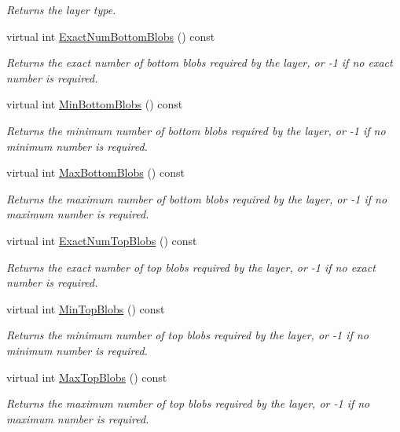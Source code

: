 \begin{DoxyCompactItemize}
\begin{DoxyCompactList}\small\item\em Returns the layer type. \end{DoxyCompactList}\item 
virtual int \hyperlink{classcaffe_1_1Layer_a45c7a7943a8a6735ac433c9be11e0240}{Exact\+Num\+Bottom\+Blobs} () const 
\begin{DoxyCompactList}\small\item\em Returns the exact number of bottom blobs required by the layer, or -\/1 if no exact number is required. \end{DoxyCompactList}\item 
virtual int \hyperlink{classcaffe_1_1Layer_ade3eee97cc743c4e68fff7eba6484916}{Min\+Bottom\+Blobs} () const 
\begin{DoxyCompactList}\small\item\em Returns the minimum number of bottom blobs required by the layer, or -\/1 if no minimum number is required. \end{DoxyCompactList}\item 
virtual int \hyperlink{classcaffe_1_1Layer_a6408ef3939f1abed1abcec46ff219289}{Max\+Bottom\+Blobs} () const 
\begin{DoxyCompactList}\small\item\em Returns the maximum number of bottom blobs required by the layer, or -\/1 if no maximum number is required. \end{DoxyCompactList}\item 
virtual int \hyperlink{classcaffe_1_1Layer_aa3c99ed707e8db683a3043412e151af8}{Exact\+Num\+Top\+Blobs} () const 
\begin{DoxyCompactList}\small\item\em Returns the exact number of top blobs required by the layer, or -\/1 if no exact number is required. \end{DoxyCompactList}\item 
virtual int \hyperlink{classcaffe_1_1Layer_a8bb143d58a740345fa2dc3d4204d553b}{Min\+Top\+Blobs} () const 
\begin{DoxyCompactList}\small\item\em Returns the minimum number of top blobs required by the layer, or -\/1 if no minimum number is required. \end{DoxyCompactList}\item 
virtual int \hyperlink{classcaffe_1_1Layer_adeff774663c6ec94424901d2746e2f03}{Max\+Top\+Blobs} () const 
\begin{DoxyCompactList}\small\item\em Returns the maximum number of top blobs required by the layer, or -\/1 if no maximum number is required. \end{DoxyCompactList}\item 

\end{DoxyCompactItemize}
